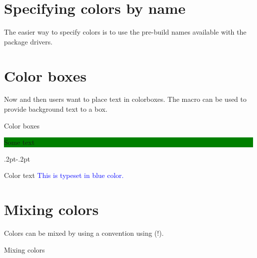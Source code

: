 \section{Specifying colors by name}

The easier way to specify colors is to use the pre-build names available
with the package drivers.


\section{Color boxes}

Now and then users want to place text in colorboxes. The macro  can be used to provide background text to a box.



\begin{texexample}{Color boxes}{}
\colorbox{green}{\begin{minipage}{3cm}
  Some text
\end{minipage}}

\fboxrule.2pt\fboxsep-.2pt
\end{texexample}


\begin{texexample}{Color text}{}
\textcolor{blue}{This is typeset in blue color.}

\end{texexample}

\section{Mixing colors}

Colors can be mixed by using a convention using (!).

\begin{texexample}{Mixing colors}{}
\color{blue!40!yellow}
\lorem
\end{texexample}

